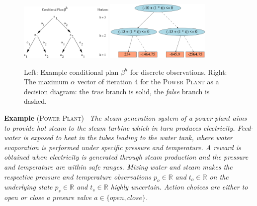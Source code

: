\documentclass{article} %
\newcommand{\open}{\mathit{open}}
\newcommand{\close}{\mathit{close}}
\begin{document}
\begin{figure}[t!]
\begin{center}
\includegraphics[width=0.4\textwidth]{pics/cond_plan2.pdf}
\hspace{5mm}
\includegraphics[width=0.45\textwidth]{pics/b1-4.pdf}
\end{center}
\vspace{-2mm}
\caption{\footnotesize Left: Example conditional plan $\beta^h$ for discrete observations. Right: The maximum $\alpha$ vector of iteration 4 for the \textsc{Power Plant}
as a decision diagram: 
the \emph{true} branch is solid, the \emph{false}
branch is dashed.}
\label{fig:cond_plan}
\vspace{-1mm}
\end{figure}

\textbf{Example} \textsc{(Power Plant)~\cite{steam2}} \emph{The steam
generation system of a power plant aims to provide hot steam to the
steam turbine which in turn produces electricity. Feed-water is
exposed to heat in the tubes leading to the water tank, where water
evaporation is performed under specific pressure and temperature.
A reward is obtained when electricity is generated through steam
production and the pressure and temperature are within safe ranges.
Mixing water and steam makes the
respective pressure and temperature observations $p_o \in \mathbb{R}$
and $t_o \in \mathbb{R}$ on the underlying state $p_s \in \mathbb{R}$
and $t_s \in \mathbb{R}$ highly uncertain.  Action choices are either
to open or close a presure valve $a \in \{ \open, \close \}$.}
\end{document}
